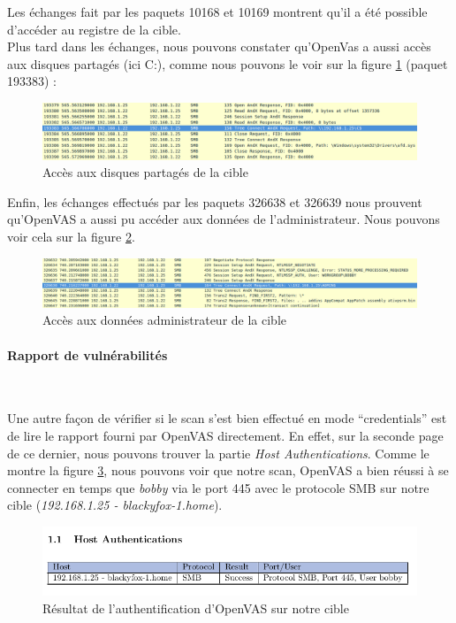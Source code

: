 Les échanges fait par les paquets 10168 et 10169 montrent qu'il a été possible d'accéder au registre de la cible.\\
Plus tard dans les échanges, nous pouvons constater qu'OpenVas a aussi accès aux disques partagés (ici C:), comme nous pouvons le voir sur la figure \ref{fig:3} (paquet 193383) :
\begin{figure}[H]
    \centering
    \includegraphics[width=\textwidth]{img/ws3.png}
    \caption{Accès aux disques partagés de la cible}
    \label{fig:3}
\end{figure}
Enfin, les échanges effectués par les paquets 326638 et 326639 nous prouvent qu'OpenVAS a aussi pu accéder aux données de l'administrateur. Nous pouvons voir cela sur la figure \ref{fig:5}.
\begin{figure}[H]
    \centering
    \includegraphics[width=\textwidth]{img/ws4.png}
    \caption{Accès aux données administrateur de la cible}
    \label{fig:5}
\end{figure}
\paragraph{Rapport de vulnérabilités}~\\\par
Une autre façon de vérifier si le scan s'est bien effectué en mode \enquote{credentials} est de lire le rapport fourni par OpenVAS directement. En effet, sur la seconde page de ce dernier, nous pouvons trouver la partie \textit{Host Authentications}. Comme le montre la figure \ref{fig:4}, nous pouvons voir que notre scan, OpenVAS a bien réussi à se connecter en temps que \textit{bobby} via le port 445 avec le protocole SMB sur notre cible (\textit{192.168.1.25 - blackyfox-1.home}).
\begin{figure}[H]
    \centering
    \includegraphics[width=\textwidth]{img/rep1.png}
    \caption{Résultat de l'authentification d'OpenVAS sur notre cible}
    \label{fig:4}
\end{figure}

